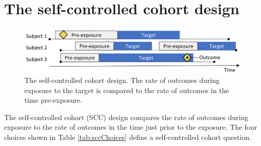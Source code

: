 \documentclass[11pt]{book}
\theoremstyle{definition}
\theoremstyle{definition}
\theoremstyle{definition}
\theoremstyle{remark}
\begin{document}
\hypertarget{the-self-controlled-cohort-design}{%
\section{The self-controlled cohort design}\label{the-self-controlled-cohort-design}}

\begin{figure}

{\centering \includegraphics[width=0.9\linewidth]{images/PopulationLevelEstimation/selfControlledCohort} 

}

\caption{The self-controlled cohort design. The rate of outcomes during exposure to the target is compared to the rate of outcomes in the time pre-exposure.}\label{fig:scc}
\end{figure}

The self-controlled cohort (SCC) design \citep{ryan_2013} compares the rate of outcomes during exposure to the rate of outcomes in the time just prior to the exposure. The four choices shown in Table \ref{tab:sccChoices} define a self-controlled cohort question.
\end{document}

